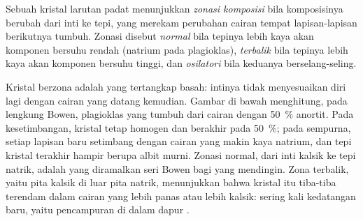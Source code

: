 \begin{definition}\label{def:b2:magmatic-differentiation:zoning}
Sebuah kristal larutan padat menunjukkan \emph{zonasi komposisi}
bila komposisinya berubah dari inti ke tepi, yang merekam perubahan cairan
tempat lapisan-lapisan berikutnya tumbuh. Zonasi disebut \emph{normal} bila tepinya lebih kaya akan
komponen bersuhu rendah (natrium pada plagioklas), \emph{terbalik} bila tepinya
lebih kaya akan komponen bersuhu tinggi, dan \emph{osilatori} bila keduanya berselang-seling.
\end{definition}

Kristal berzona adalah  yang tertangkap basah: intinya tidak
menyesuaikan diri lagi dengan cairan yang datang kemudian. Gambar di bawah menghitung, pada lengkung Bowen,
plagioklas yang tumbuh dari cairan dengan \qty{50}{\percent} anortit. Pada
kesetimbangan, kristal tetap homogen dan berakhir pada \qty{50}{\percent}; pada  sempurna, setiap lapisan baru setimbang dengan cairan yang makin kaya natrium,
dan tepi kristal terakhir hampir berupa albit murni. Zonasi normal, dari
inti kalsik ke tepi natrik, adalah yang diramalkan seri Bowen bagi  yang mendingin. Zona
terbalik, yaitu pita kalsik di luar pita natrik, menunjukkan bahwa kristal itu tiba-tiba terendam dalam
cairan yang lebih panas atau lebih kalsik: sering kali kedatangan  baru, yaitu pencampuran di dalam
dapur .


